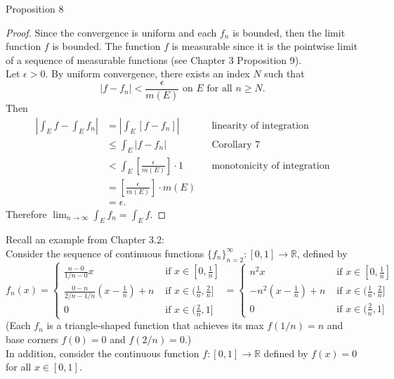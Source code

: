 \begin{flushleft}
\begin{namedthm*}{Proposition 8}
\[        \]
    \end{namedthm*}
    \begin{proof}
        Since the convergence is uniform and each $f_n$ is bounded, then the limit function $f$ is bounded.
        The function $f$ is measurable since it is the pointwise limit of a sequence of measurable functions (see Chapter 3 Proposition 9).
        \\Let $\epsilon>0$.
        By uniform convergence, there exists an index $N$ such that 
        \[
            |f-f_n|<\frac{\epsilon}{m(E)}\text{ on $E$ for all }n\ge N. 
        \]
        Then
        \begin{align*}
            |\int_Ef-\int_Ef_n|&=|\int_E[f-f_n]|&&\text{linearity of integration}\\
            &\le\int_E|f-f_n|&&\text{Corollary 7}\\
            &<\int_E[\frac{\epsilon}{m(E)}]\cdot1&&\text{monotonicity of integration}\\
            &=[\frac{\epsilon}{m(E)}]\cdot m(E)\\
            &=\epsilon.
        \end{align*}
        Therefore $\lim_{n\to\infty}\int_Ef_n=\int_Ef$.
    \end{proof}
    Recall an example from Chapter 3.2:
        \\Consider the sequence of continuous functions $\{f_n\}_{n=2}^\infty:[0,1]\to\mathbb{R}$, defined by
        \[ 
		f_n(x) =
            \begin{cases} 
                \frac{n-0}{1/n-0}x& \text{ if } x \in [0,\frac{1}{n}]\\
                \frac{0-n}{2/n-1/n}(x-\frac{1}{n})+n & \text{ if } x \in (\frac{1}{n},\frac{2}{n}]\\
                0& \text{ if } x \in (\frac{2}{n},1]
            \end{cases}
            =
            \begin{cases} 
                n^2x& \text{ if } x \in [0,\frac{1}{n}]\\
                -n^2(x-\frac{1}{n})+n & \text{ if } x \in (\frac{1}{n},\frac{2}{n}]\\
                0& \text{ if } x \in (\frac{2}{n},1]
            \end{cases}
	    \]
        (Each $f_n$ is a triangle-shaped function that achieves its max $f(1/n)=n$ and base corners $f(0)=0$ and $f(2/n)=0$.)\\
        In addition, consider the continuous function $f:[0,1]\to\mathbb{R}$ defined by $f(x)=0$ for all $x\in[0,1]$.\\\bigskip

\end{flushleft}
